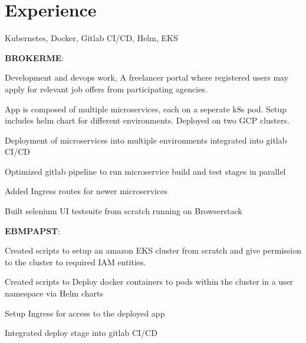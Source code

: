 \documentclass[]{font}
\begin{document}
\begin{minipage}[t]{0.66\textwidth} 


\section{Experience}

Kubernetes, Docker, Gitlab CI/CD, Helm, EKS
\vspace{\topsep}

\textbf{BROKERME}:
\vspace{\topsep}

\begin{tightemize}
\item Development and devops work, A freelancer portal where registered users may apply for relevant job offers from participating agencies.
\item App is composed of multiple microservices, each on a seperate k8s pod. Setup includes helm chart for different environments. Deployed on two GCP clusters.
\item Deployment of microservices into multiple environments integrated into gitlab CI/CD
\item Optimized gitlab pipeline to run microservice build and test stages in parallel
\item Added Ingress routes for newer microservices
\item Built selenium UI testsuite from scratch running on Browserstack
\end{tightemize}

\vspace{\topsep}
\textbf{EBMPAPST}:

\begin{tightemize}
\item Created scripts to setup an amazon EKS cluster from scratch and give permission to the cluster to required IAM entities.
\item Created scripts to Deploy docker containers to pods within the cluster in a user namespace via Helm charts
\item Setup Ingress for access to the deployed app 
\item Integrated deploy stage into gitlab CI/CD
\end{tightemize}
\sectionsep


\end{minipage}
\end{document}
